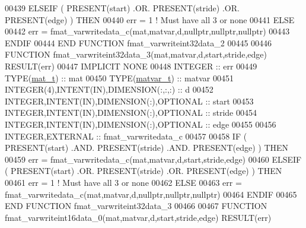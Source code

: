 \begin{DoxyCode}
00439     \textcolor{keywordflow}{ELSEIF} ( \textcolor{keyword}{PRESENT}(start) .OR. \textcolor{keyword}{PRESENT}(stride) .OR. \textcolor{keyword}{PRESENT}(edge) ) \textcolor{keywordflow}{THEN}
00440         err = 1    \textcolor{comment}{! Must have all 3 or none}
00441     \textcolor{keywordflow}{ELSE}
00442         err = fmat\_varwritedata\_c(mat,matvar,d,nullptr,nullptr,nullptr)
00443 \textcolor{keywordflow}{    ENDIF}
00444 \textcolor{keyword}{END FUNCTION }fmat\_varwriteint32data\_2
00445 
00446 \textcolor{keyword}{FUNCTION }fmat\_varwriteint32data\_3(mat,matvar,d,start,stride,edge) \textcolor{keyword}{RESULT}(err)
00447 \textcolor{keywordtype}{IMPLICIT NONE}
00448     \textcolor{keywordtype}{INTEGER}                                  :: err
00449     \textcolor{keywordtype}{TYPE}(\hyperlink{group___m_a_t_gab0fc888f5a5d79943b16284b1f91c2e8}{mat\_t})                              :: mat
00450     \textcolor{keywordtype}{TYPE}(\hyperlink{group___m_a_t_structmatvar__t}{matvar\_t})                           :: matvar
00451     \textcolor{keywordtype}{INTEGER(4)},\textcolor{keywordtype}{INTENT(IN)},\textcolor{keywordtype}{DIMENSION(:,:,:)}   :: d
00452     \textcolor{keywordtype}{INTEGER},\textcolor{keywordtype}{INTENT(IN)},\textcolor{keywordtype}{DIMENSION(:)},\textcolor{keywordtype}{OPTIONAL} :: start
00453     \textcolor{keywordtype}{INTEGER},\textcolor{keywordtype}{INTENT(IN)},\textcolor{keywordtype}{DIMENSION(:)},\textcolor{keywordtype}{OPTIONAL} :: stride
00454     \textcolor{keywordtype}{INTEGER},\textcolor{keywordtype}{INTENT(IN)},\textcolor{keywordtype}{DIMENSION(:)},\textcolor{keywordtype}{OPTIONAL} :: edge
00455 
00456     \textcolor{keywordtype}{INTEGER},\textcolor{keywordtype}{EXTERNAL}                         :: fmat\_varwritedata\_c
00457 
00458     \textcolor{keywordflow}{IF} ( \textcolor{keyword}{PRESENT}(start) .AND. \textcolor{keyword}{PRESENT}(stride) .AND. \textcolor{keyword}{PRESENT}(edge) ) \textcolor{keywordflow}{THEN}
00459         err = fmat\_varwritedata\_c(mat,matvar,d,start,stride,edge)
00460     \textcolor{keywordflow}{ELSEIF} ( \textcolor{keyword}{PRESENT}(start) .OR. \textcolor{keyword}{PRESENT}(stride) .OR. \textcolor{keyword}{PRESENT}(edge) ) \textcolor{keywordflow}{THEN}
00461         err = 1    \textcolor{comment}{! Must have all 3 or none}
00462     \textcolor{keywordflow}{ELSE}
00463         err = fmat\_varwritedata\_c(mat,matvar,d,nullptr,nullptr,nullptr)
00464 \textcolor{keywordflow}{    ENDIF}
00465 \textcolor{keyword}{END FUNCTION }fmat\_varwriteint32data\_3
00466 
00467 \textcolor{keyword}{FUNCTION }fmat\_varwriteint16data\_0(mat,matvar,d,start,stride,edge) \textcolor{keyword}{RESULT}(err)

\end{DoxyCode}
